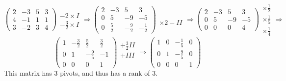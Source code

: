\documentclass[12pt]{article}
\begin{document}
$$
\begin{pmatrix}
2 & -3 & 5 & 3\\
4 & -1 & 1 & 1\\
3 & -2 & 3 & 4
\end{pmatrix}
\begin{matrix}
\\
-2 \times I\\
-\frac{3}{2} \times I
\end{matrix}
\Rightarrow
\begin{pmatrix}
2 & -3 & 5 & 3\\
0 & 5 & -9 & -5\\
0 & \frac{5}{2} & -\frac{9}{2} & -\frac{1}{2}
\end{pmatrix}
\begin{matrix}
\\
\\
\times 2 - II
\end{matrix}
\Rightarrow
\begin{pmatrix}
2 & -3 & 5 & 3\\
0 & 5 & -9 & -5\\
0 & 0 & 0 & 4
\end{pmatrix}
\begin{matrix}
\times \frac{1}{2}\\
\times \frac{1}{5}\\
\times \frac{1}{4}
\end{matrix}
\Rightarrow
$$
$$
\begin{pmatrix}
1 & -\frac{3}{2} & \frac{5}{2} & \frac{3}{2}\\
0 & 1 & -\frac{9}{5} & -1\\
0 & 0 & 0 & 1
\end{pmatrix}
\begin{matrix}
+ \frac{3}{2} II\\
+ III\\
\\
\end{matrix}
\Rightarrow
\begin{pmatrix}
1 & 0 & -\frac{1}{5} & 0\\
0 & 1 & -\frac{9}{5} & 0\\
0 & 0 & 0 & 1
\end{pmatrix}
$$
This matrix has 3 pivots, and thus has a rank of 3.\\
\end{document}
